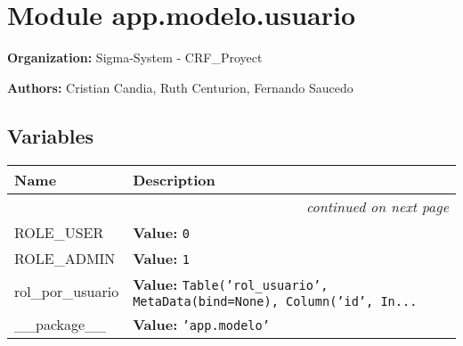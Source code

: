 %
%
%


\section{Module app.modelo.usuario}

    \label{app:modelo:usuario}
\textbf{Organization:} Sigma-System - CRF\_Proyect



\textbf{Authors:}
Cristian Candia,
    Ruth Centurion,
    Fernando Saucedo



  \subsection{Variables}

    \vspace{-1cm}
\hspace{\varindent}\begin{longtable}{|p{\varnamewidth}|p{\vardescrwidth}|l}
\cline{1-2}
\cline{1-2} \centering \textbf{Name} & \centering \textbf{Description}& \\
\cline{1-2}
\endhead\cline{1-2}\multicolumn{3}{r}{\small\textit{continued on next page}}\\\endfoot\cline{1-2}
\endlastfoot\raggedright R\-O\-L\-E\-\_\-U\-S\-E\-R\- & \raggedright \textbf{Value:} 
{\tt 0}&\\
\cline{1-2}
\raggedright R\-O\-L\-E\-\_\-A\-D\-M\-I\-N\- & \raggedright \textbf{Value:} 
{\tt 1}&\\
\cline{1-2}
\raggedright r\-o\-l\-\_\-p\-o\-r\-\_\-u\-s\-u\-a\-r\-i\-o\- & \raggedright \textbf{Value:} 
{\tt Table('rol\_usuario', MetaData(bind=None), Column('id', In\texttt{...}}&\\
\cline{1-2}
\raggedright \_\-\_\-p\-a\-c\-k\-a\-g\-e\-\_\-\_\- & \raggedright \textbf{Value:} 
{\tt \texttt{'}\texttt{app.modelo}\texttt{'}}&\\
\cline{1-2}
\end{longtable}


